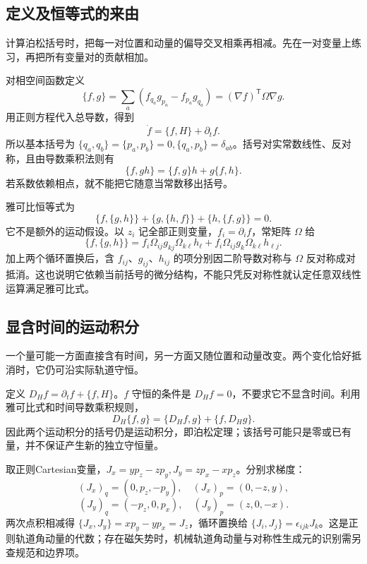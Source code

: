 \subsection{定义及恒等式的来由}
计算泊松括号时，把每一对位置和动量的偏导交叉相乘再相减。先在一对变量上练习，再把所有变量对的贡献相加。

对相空间函数定义
\begin{equation}
\{f,g\}=\sum_a(f_{q_a}g_{p_a}-f_{p_a}g_{q_a})
=(\nabla f)^{\mathsf T}\Omega\nabla g.
\label{eq:poisson-bracket}
\end{equation}
用正则方程代入总导数，得到
\begin{equation}
\dot f=\{f,H\}+\partial_tf.
\label{eq:poisson-evolution}
\end{equation}
所以基本括号为 $\{q_a,q_b\}=\{p_a,p_b\}=0,\{q_a,p_b\}=\delta_{ab}$。括号对实常数线性、反对称，且由导数乘积法则有
\[
\{f,gh\}=\{f,g\}h+g\{f,h\}.
\]
若系数依赖相点，就不能把它随意当常数移出括号。

雅可比恒等式为
\begin{equation}
\{f,\{g,h\}\}+\{g,\{h,f\}\}+\{h,\{f,g\}\}=0.
\label{eq:pb-jacobi}
\end{equation}
它不是额外的运动假设。以 $z_i$ 记全部正则变量，$f_i=\partial_if$，常矩阵 $\Omega$ 给
\[
\{f,\{g,h\}\}=f_i\Omega_{ij}g_{kj}\Omega_{k\ell}h_\ell
+f_i\Omega_{ij}g_k\Omega_{k\ell}h_{\ell j}.
\]
加上两个循环置换后，含 $f_{ij}$、$g_{ij}$、$h_{ij}$ 的项分别因二阶导数对称与 $\Omega$ 反对称成对抵消。这也说明它依赖当前括号的微分结构，不能只凭反对称性就认定任意双线性运算满足雅可比式。

\subsection{显含时间的运动积分}
一个量可能一方面直接含有时间，另一方面又随位置和动量改变。两个变化恰好抵消时，它仍可沿实际轨道守恒。

定义 $D_Hf=\partial_tf+\{f,H\}$。$f$ 守恒的条件是 $D_Hf=0$，不要求它不显含时间。利用雅可比式和时间导数乘积规则，
\[
D_H\{f,g\}=\{D_Hf,g\}+\{f,D_Hg\}.
\]
因此两个运动积分的括号仍是运动积分，即泊松定理；该括号可能只是零或已有量，并不保证产生新的独立守恒量。

\begin{example}[角动量代数与空间转动]
取正则Cartesian变量，$J_x=yp_z-zp_y,J_y=zp_x-xp_z$。分别求梯度：
\[
(J_x)_q=(0,p_z,-p_y),\quad(J_x)_p=(0,-z,y),
\]
\[
(J_y)_q=(-p_z,0,p_x),\quad(J_y)_p=(z,0,-x).
\]
两次点积相减得 $\{J_x,J_y\}=xp_y-yp_x=J_z$，循环置换给 $\{J_i,J_j\}=\epsilon_{ijk}J_k$。这是正则轨道角动量的代数；存在磁矢势时，机械轨道角动量与对称性生成元的识别需另查规范和边界项。
\end{example}

